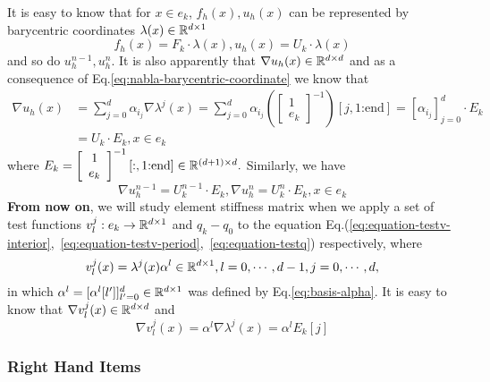 It is easy to know that for $x\in e_k$, $f_h(x),u_h(x)$ can be represented by 
barycentric coordinates $\lambda(x)\in\mathbb{R}^{d\times1}$
\[f_h(x)=F_k\cdot\lambda(x),u_h(x)=U_k\cdot\lambda(x)\]
and so do $u_h^{n-1},u_h^n$. It is also apparently that
$\nabla u_h(x)\in\mathbb{R}^{d\times d}$ and as a consequence of Eq.\eqref{eq:nabla-barycentric-coordinate} we know that
\begin{equation*}
  \begin{split}
  \nabla u_h(x)&=\sum_{j=0}^d\alpha_{i_j}\nabla\lambda^j(x)=\sum_{j=0}^d\alpha_{i_j}
\left(
\left[\begin{array}{c} 
  1 \\ 
  e_k 
\end{array}\right]^{-1}
\right)[j,1\text{:end}]
=[\alpha_{i_j}]_{j=0}^d\cdot
E_k \\
  &=U_k\cdot E_k,x\in e_k
  \end{split}
\end{equation*}
where $E_k=
\left[\begin{array}{c} 
  1 \\ 
  e_k 
\end{array}\right]^{-1}[:,1\text{:end}]\in\mathbb{R}^{(d+1)\times d}.
$
Similarly, we have
\begin{equation}\label{eq:u-gradient}
  \nabla u_h^{n-1}=U_k^{n-1}\cdot E_k,
  \nabla u_h^{n}=U_k^n\cdot E_k, x\in e_k
\end{equation}
\textbf{From now on}, we will study element stiffness matrix when we apply 
a set of test functions $v^j_l:e_k\to\mathbb{R}^{d\times1}$ and $q_k-q_0$ to the equation 
Eq.(\ref{eq:equation-testv-interior},~\ref{eq:equation-testv-period},~\ref{eq:equation-testq}) respectively, where
\[v^j_l(x)=\lambda^j(x)\alpha^l\in\mathbb{R}^{d\times1},l=0,\cdots,d-1,j=0,\cdots,d,\]
in which $\alpha^l=[\alpha^l[l']]_{l'=0}^d\in\mathbb{R}^{d\times1}$ was defined by Eq.\eqref{eq:basis-alpha}.
It is easy to know that $\nabla v^j_l(x)\in\mathbb{R}^{d\times d}$ and
\[
  \nabla v^j_l(x)=\alpha^l\nabla\lambda^j(x)
  =\alpha^lE_k[j]
  \]

\subsubsection{Right Hand Items}
